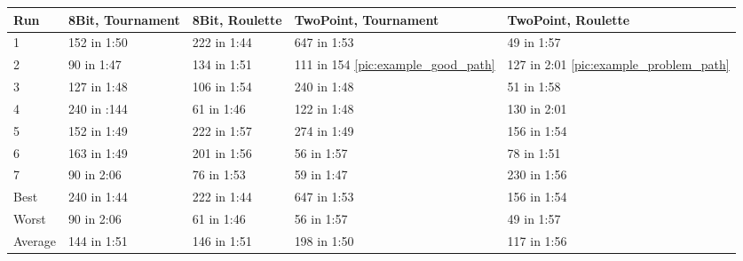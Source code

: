\begin{center}
	\begin{tabular}{| l | l | l | p{3cm} | p{3cm}|}
		\hline
		Run 		& 8Bit, Tournament 	& 8Bit, Roulette 	& TwoPoint, Tournament 	& TwoPoint, Roulette	\\ \hline
		1				&	152 in 1:50				&	222 in 1:44			&	647 in 1:53						&	49 in 1:57					\\ \hline
		2				&	90 in 1:47				&	134 in 1:51			& 111 in 154 \ref{pic:example_good_path}			&	127 in 2:01 \ref{pic:example_problem_path}	\\ \hline		
		3				&	127 in 1:48				&	106 in 1:54			& 240 in 1:48						& 51 in 1:58					\\ \hline
		4				&	240 in :144				&	61 in 1:46			& 122 in 1:48						& 130 in 2:01					\\ \hline
		5				&	152 in 1:49				&	222 in 1:57			&	274 in 1:49						&	156 in 1:54					\\ \hline
		6				&	163 in 1:49				& 201 in 1:56			&	56 in 1:57						& 78 in 1:51					\\ \hline
		7				&	90 in 2:06				&	76 in 1:53			& 59 in 1:47						& 230 in 1:56					\\ \hline
		Best		&	240 in 1:44				&	222 in 1:44			&	647 in 1:53						&	156 in 1:54					\\ \hline
		Worst		&	90 in 2:06				&	61 in 1:46			&	56 in 1:57						& 49 in 1:57					\\ \hline
		Average	&	144 in 1:51				& 146 in 1:51			& 198 in 1:50						&	117 in 1:56					\\ \hline
		\hline
	\end{tabular}
\end{center}


